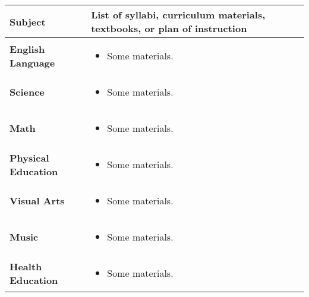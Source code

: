 \documentclass[10pt]{article}
\begin{document}
\noindent\begin{tabularx}{\textwidth}{ |p{2in}|X| }

\hline

{\bf Subject} & {\bf List of syllabi, curriculum materials, textbooks,
      or plan of instruction} \\

\hline

{\bf English Language} &
\begin{itemize}
\item Some materials.
\end{itemize}\\

\hline

{\bf Science}  &
\begin{itemize}
\item Some materials.
\end{itemize} \\

\hline

{\bf Math} &
\begin{itemize}
\item Some materials.
\end{itemize} \\

\hline

{\bf Physical Education} &
\begin{itemize}
\item Some materials.
\end{itemize}\\

\hline

{\bf Visual Arts} &
\begin{itemize}
\item Some materials.
\end{itemize}\\

\hline

{\bf Music} &
\begin{itemize}
\item Some materials.
\end{itemize}\\

\hline

{\bf Health Education} &
\begin{itemize}
\item Some materials.
\end{itemize}\\

\hline

\end{tabularx}
\end{document}
